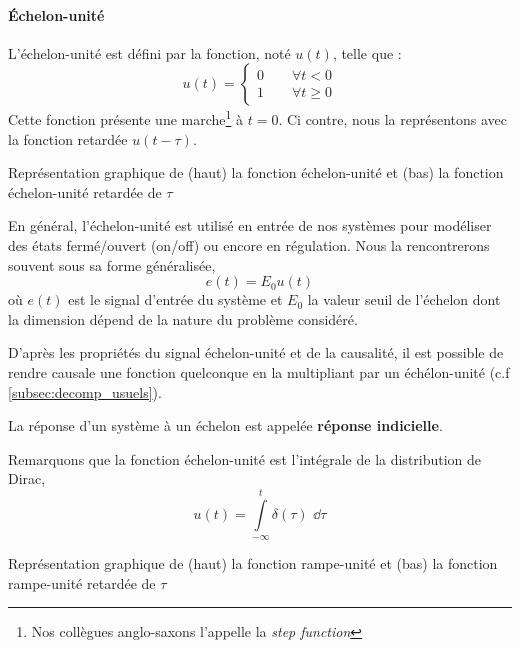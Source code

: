 \paragraph{\'Echelon-unité}
L'échelon-unité est défini par la fonction, noté $u(t)$, telle que :
\[
    u(t)=
    \begin{cases} 
    0 \qquad \forall t<0    \\ 
    1 \qquad \forall t\geq 0 
    \end{cases}
\]
Cette fonction présente une marche\footnote{Nos 
collègues anglo-saxons l'appelle la \og\emph{step function}\fg} à $t=0$. 
Ci contre, nous la représentons avec la fonction retardée $u(t-\tau)$.
\begin{marginfigure}
    \centering
    
    \caption{Représentation graphique de (haut) la fonction échelon-unité 
             et (bas) la fonction échelon-unité retardée de $\tau$
            \label{fig-echelon}}
\end{marginfigure}
En général, l'échelon-unité est utilisé en entrée de nos systèmes pour 
modéliser des états fermé/ouvert (\og on/off\fg) ou encore en régulation.
Nous la rencontrerons souvent sous sa forme généralisée, 
\[
    e(t)=E_0u(t)
\]
où $e(t)$ est le signal d'entrée du système et $E_0$ la valeur seuil 
de l'échelon dont la dimension dépend de la nature du problème considéré.

D'après les propriétés du signal échelon-unité et de la causalité, il 
est possible de rendre causale une fonction quelconque en la 
multipliant par un échélon-unité (c.f \ref{subsec:decomp_usuels}).

La réponse d'un système à un échelon est appelée 
\textbf{réponse indicielle}.

Remarquons que la fonction échelon-unité est l'intégrale 
de la distribution de Dirac,
\begin{equation}
    u(t)=\int\limits_{-\infty}^{t} \delta(\tau)\,\,\dd{\tau}
    \label{eq-echelon-dirac_relation}
\end{equation}
\begin{marginfigure}
    \centering
    
    \caption{Représentation graphique de (haut) la fonction rampe-unité et 
                                     (bas) la fonction rampe-unité retardée
                                     de $\tau$\label{fig-rampe}}
\end{marginfigure}
